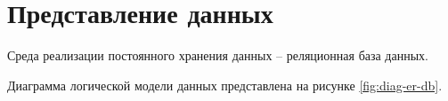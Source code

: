\section{Представление данных}
Среда реализации постоянного хранения данных -- реляционная база данных.

Диаграмма логической модели данных представлена на рисунке
\ref{fig:diag-er-db}.
